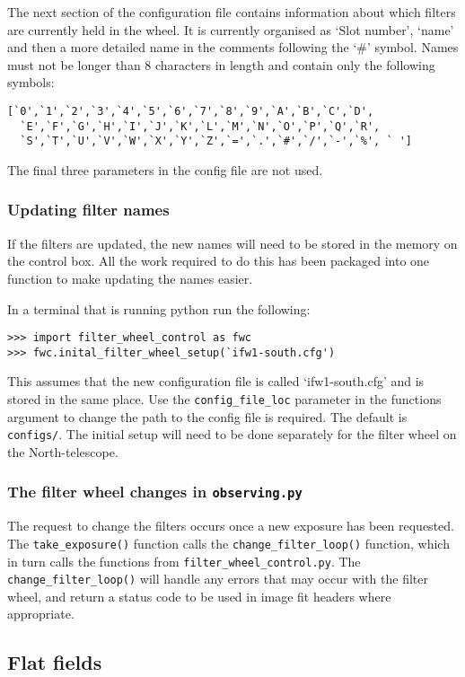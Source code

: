\documentclass[a4paper,12pt]{article}
\newcommand{\observing}{\tt{observing.py}}
\begin{document}
The next section of the configuration file contains information about which filters are currently held in the wheel. It is currently organised as `Slot number', `name' and then a more detailed name in the comments following the `\#' symbol. Names must not be longer than 8 characters in length and contain only the following symbols:
\begin{verbatim}
[`0',`1',`2',`3',`4',`5',`6',`7',`8',`9',`A',`B',`C',`D',
  `E',`F',`G',`H',`I',`J',`K',`L',`M',`N',`O',`P',`Q',`R',
  `S',`T',`U',`V',`W',`X',`Y',`Z',`=',`.',`#',`/',`-',`%', ` ']
\end{verbatim}

The final three parameters in the config file are not used.

\subsubsection{Updating filter names}
\label{subsubsec:updateNames}
If the filters are updated, the new names will need to be stored in the memory on the control box. All the work required to do this has been packaged into one function to make updating the names easier.

In a terminal that is running python run the following:
\begin{verbatim}
>>> import filter_wheel_control as fwc
>>> fwc.inital_filter_wheel_setup(`ifw1-south.cfg')
\end{verbatim}
This assumes that the new configuration file is called `ifw1-south.cfg' and is stored in the same place. Use the {\tt config\_file\_loc} parameter in the functions argument to change the path to the config file is required. The default is {\tt configs/}. The initial setup will need to be done separately for the filter wheel on the North-telescope.

\subsubsection{The filter wheel changes in {\observing}}

The request to change the filters occurs once a new exposure has been requested. The {\tt take\_exposure()} function calls the {\tt change\_filter\_loop()} function, which in turn calls the functions from {\tt filter\_wheel\_control.py}. The {\tt change\_filter\_loop()} will handle any errors that may occur with the filter wheel, and return a status code to be used in image fit headers where appropriate.

\subsection{Flat fields}
\label{sec:flat}
\end{document}
